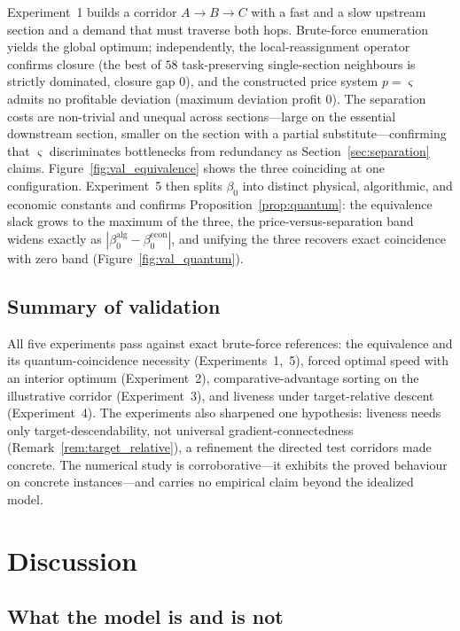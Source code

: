 \documentclass[11pt,twocolumn,a4paper]{article}
\theoremstyle{definition}
\theoremstyle{remark}
\newcommand{\blocktime}{\beta_0}
\newcommand{\sep}{\varsigma}
\begin{document}
Experiment~1 builds a corridor $A\to B\to C$ with a fast and a slow upstream section and a demand that must traverse both hops. Brute-force enumeration yields the global optimum; independently, the local-reassignment operator confirms closure (the best of $58$ task-preserving single-section neighbours is strictly dominated, closure gap $0$), and the constructed price system $p=\sep$ admits no profitable deviation (maximum deviation profit $0$). The separation costs are non-trivial and unequal across sections---large on the essential downstream section, smaller on the section with a partial substitute---confirming that $\sep$ discriminates bottlenecks from redundancy as Section~\ref{sec:separation} claims. Figure~\ref{fig:val_equivalence} shows the three coinciding at one configuration. Experiment~5 then splits $\blocktime$ into distinct physical, algorithmic, and economic constants and confirms Proposition~\ref{prop:quantum}: the equivalence slack grows to the maximum of the three, the price-versus-separation band widens exactly as $|\blocktime^{\mathrm{alg}}-\blocktime^{\mathrm{econ}}|$, and unifying the three recovers exact coincidence with zero band (Figure~\ref{fig:val_quantum}).



\subsection{Summary of validation}

All five experiments pass against exact brute-force references: the equivalence and its quantum-coincidence necessity (Experiments~1,~5), forced optimal speed with an interior optimum (Experiment~2), comparative-advantage sorting on the illustrative corridor (Experiment~3), and liveness under target-relative descent (Experiment~4). The experiments also sharpened one hypothesis: liveness needs only target-descendability, not universal gradient-connectedness (Remark~\ref{rem:target_relative}), a refinement the directed test corridors made concrete. The numerical study is corroborative---it exhibits the proved behaviour on concrete instances---and carries no empirical claim beyond the idealized model.

\section{Discussion}

\subsection{What the model is and is not}
\end{document}
